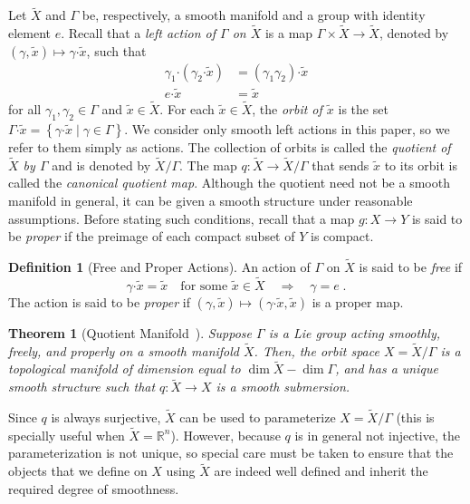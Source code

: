 \documentclass{article}
\newtheorem{theorem}{Theorem}
\theoremstyle{definition}
\newtheorem{definition}{Definition}
\theoremstyle{remark}
\newcommand{\bscdot}{\boldsymbol{\cdot}}
\newcommand{\DI}{\tilde{X}}	%
\newcommand{\di}{\tilde{x}}	%
\newcommand{\MA}{X}	%
\newcommand{\MAp}{Y}	%
\newcommand{\RR}{\mathbb{R}}	%
\begin{document}
Let $\DI$ and $\Gamma$ be, respectively, a smooth manifold and a group with identity element $e$. Recall that
a \emph{left action of $\Gamma$ on $\DI$} is a map $\Gamma \times \DI \to \DI$, denoted by
$(\gamma,\di) \mapsto \gamma\bscdot \di$, such that
\begin{displaymath}
\begin{aligned}
 \gamma_1 \bscdot (\gamma_2\bscdot \di) &= (\gamma_1 \gamma_2)\bscdot \di \\
                          e \bscdot \di &= \di
\end{aligned}
\end{displaymath}
for all $\gamma_1,\gamma_2 \in \Gamma$ and $\di \in \DI$. For each $\di \in \DI$, the \emph{orbit of $\di$} is the set
$\Gamma \bscdot \di = \left\{ \gamma \bscdot \di \mid \gamma \in \Gamma \right\}$.
We consider only smooth left actions in this paper, so we refer to them simply as actions.
The collection of orbits is called the \emph{quotient of $\DI$ by $\Gamma$} and is denoted by $\DI/\Gamma$. The map
$q : \DI \to \DI/\Gamma$ that sends $\di$ to its orbit is called the \emph{canonical quotient map}.
Although the quotient need not be a smooth manifold in general, it can be given a smooth structure under reasonable
assumptions. Before stating such conditions, recall that a map $g : \MA \to \MAp$ is said to be \emph{proper} 
if the preimage of each compact subset of $\MAp$ is compact.

\begin{definition}[Free and Proper Actions]
 An action of $\Gamma$ on $\DI$ is said to be \emph{free} if
 \begin{displaymath}
  \gamma \bscdot \di = \di \quad \text{for some $\di \in \DI$} \quad \Longrightarrow \quad \gamma = e \;.
 \end{displaymath}
 The action is said to be \emph{proper} if $(\gamma,\di) \mapsto (\gamma\bscdot\di,\di)$ is a proper map.
\end{definition}

\begin{theorem}[Quotient Manifold~\cite{lee}] \label{thm:quotient}
 Suppose $\Gamma$ is a Lie group acting smoothly, freely, and properly on a smooth manifold $\DI$. Then, the orbit
 space $\MA = \DI/\Gamma$ is a topological manifold of dimension equal to $\dim \DI - \dim \Gamma$, and has a
 unique smooth structure such that $q : \DI \to \MA$ is a smooth submersion.
\end{theorem}

Since $q$ is always surjective, $\DI$ can be used to parameterize $\MA = \DI/\Gamma$ (this is specially
useful when $\DI=\RR^n$). However, because $q$ is in general not injective, the parameterization is not unique, 
so special care must be taken to ensure that the objects that we define on $\MA$ using $\DI$ are indeed well
defined and inherit the required degree of smoothness. 
\end{document}

